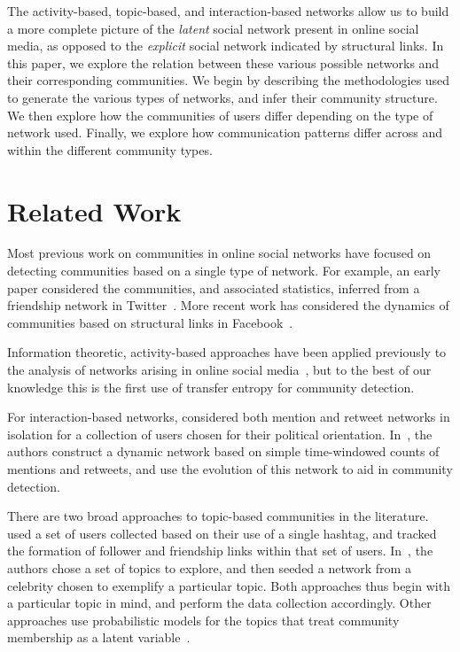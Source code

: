The activity-based, topic-based, and interaction-based networks allow us to build a more complete picture of the \emph{latent} social network present in online social media, as opposed to the \emph{explicit} social network indicated by structural links. In this paper, we explore the relation between these various possible networks and their corresponding communities. We begin by describing the methodologies used to generate the various types of networks, and infer their community structure. We then explore how the communities of users differ depending on the type of network used. Finally, we explore how communication patterns differ across and within the different community types.

\section{Related Work}

Most previous work on communities in online social networks have focused on detecting communities based on a single type of network. For example, an early paper considered the communities, and associated statistics, inferred from a friendship network in Twitter~\cite{java2009we}. More recent work has considered the dynamics of communities based on structural links in Facebook~\cite{nguyen2011adaptive}.


Information theoretic, activity-based approaches have been applied previously to the analysis of networks arising in online social media~\cite{ver2012information,darmon2013detecting}, but to the best of our knowledge this is the first use of transfer entropy for community detection.

For interaction-based networks, \cite{conover2011political} considered both mention and retweet networks in isolation for a collection of users chosen for their political orientation. In~\cite{deitrick2013mutually}, the authors construct a dynamic network based on simple time-windowed counts of mentions and retweets, and use the evolution of this network to aid in community detection.

There are two broad approaches to topic-based communities in the literature. \cite{rossi2012conversation} used a set of users collected based on their use of a single hashtag, and tracked the formation of follower and friendship links within that set of users. In~\cite{lim2012following}, the authors chose a set of topics to explore, and then seeded a network from a celebrity chosen to exemplify a particular topic. Both approaches thus begin with a particular topic in mind, and perform the data collection accordingly. Other approaches use probabilistic models for the topics that treat community membership as a latent variable~\cite{yin2012latent}.

